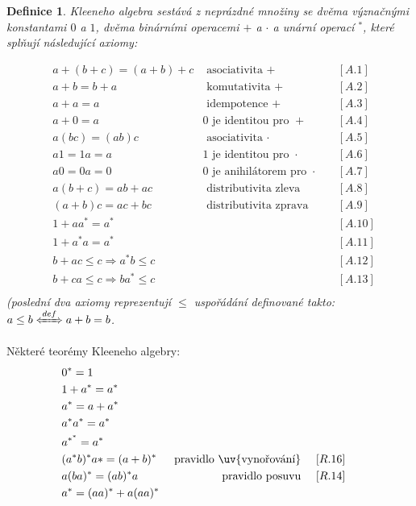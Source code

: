 \documentclass[a4paper, 11pt]{report}
\newtheorem{mydef}{Definice}[chapter]
\begin{document}
\begin{mydef}
Kleeneho algebra sestává z neprázdné množiny se dvěma význačnými konstantami $0$ a $1$, dvěma binárními operacemi $+$ a $\cdot$ a unární operací $^*$, které splňují následující axiomy:

\begin{subequations}
\begin{align*}
	& a + (b + c) = (a + b) + c		& \text{ asociativita } + 				\quad & [A.1] \\
	& a + b = b + a					& \text{ komutativita } +				\quad & [A.2] \\
	& a + a = a						& \text{ idempotence } + 				\quad & [A.3] \\
	& a + 0 = a						& 0 \text{ je identitou pro } + 		\quad & [A.4] \\
	& a(bc) = (ab)c					& \text{ asociativita } \cdot 			\quad & [A.5] \\
	& a1 = 1a = a					& 1 \text{ je identitou pro } \cdot		\quad & [A.6] \\
	& a0 = 0a = 0					& 0 \text{ je anihilátorem pro } \cdot	\quad & [A.7] \\
	& a(b + c) = ab + ac			& \text{ distributivita zleva }			\quad & [A.8] \\
	& (a + b)c = ac + bc			& \text{ distributivita zprava }		\quad & [A.9] \\
	& 1 + aa^* = a^*				&										\quad & [A.10] \\
	& 1 + a^*a = a^*				&										\quad & [A.11] \\
	& b + ac \leq c \Rightarrow a^*b \leq c &								\quad & [A.12] \\
	& b + ca \leq c \Rightarrow ba^* \leq c &								\quad & [A.13] \\
\end{align*}
\end{subequations}
(poslední dva axiomy reprezentují $\leq$ uspořádání definované takto: $a \leq b \xLeftrightarrow{def} a+b=b$.
\end{mydef}

Některé teorémy Kleeneho algebry:
\begin{subequations}
\begin{align*}
	& 0^* = 1						& \\
	& 1 + a^* = a^*					& \\
	& a^* = a + a^*					& \\
	& a^* a^* = a^*					& \\
	& a^{*^*} = a^*					& \\
	& (a^*b)^*a* = (a + b)^*		& \text{ pravidlo \uv{vynořování} }		\quad & [R.16] \\
	& a (ba)^* = (ab)^* a			& \text{ pravidlo posuvu }				\quad & [R.14] \\
	& a^* = (aa)^* + a (aa)^*		& \\
\end{align*}
\end{subequations}
\end{document}
